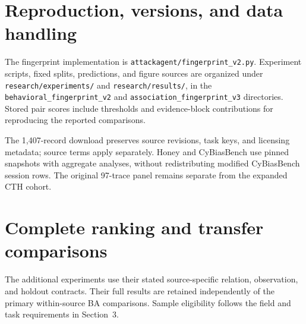 \documentclass[10pt]{article}
\begin{document}
\section{Reproduction, versions, and data handling}
The fingerprint implementation is \texttt{attackagent/fingerprint\_v2.py}. Experiment scripts, fixed splits, predictions, and figure sources are organized under \texttt{research/experiments/} and \texttt{research/results/}, in the \texttt{behavioral\_fingerprint\_v2} and \texttt{association\_fingerprint\_v3} directories. Stored pair scores include thresholds and evidence-block contributions for reproducing the reported comparisons.

The 1,407-record download preserves source revisions, task keys, and licensing metadata; source terms apply separately. Honey and CyBiasBench use pinned snapshots with aggregate analyses, without redistributing modified CyBiasBench session rows. The original 97-trace panel remains separate from the expanded CTH cohort.

\section{Complete ranking and transfer comparisons}\label{app:transfer}
The additional experiments use their stated source-specific relation, observation, and holdout contracts. Their full results are retained independently of the primary within-source BA comparisons. Sample eligibility follows the field and task requirements in Section~3.
\end{document}
